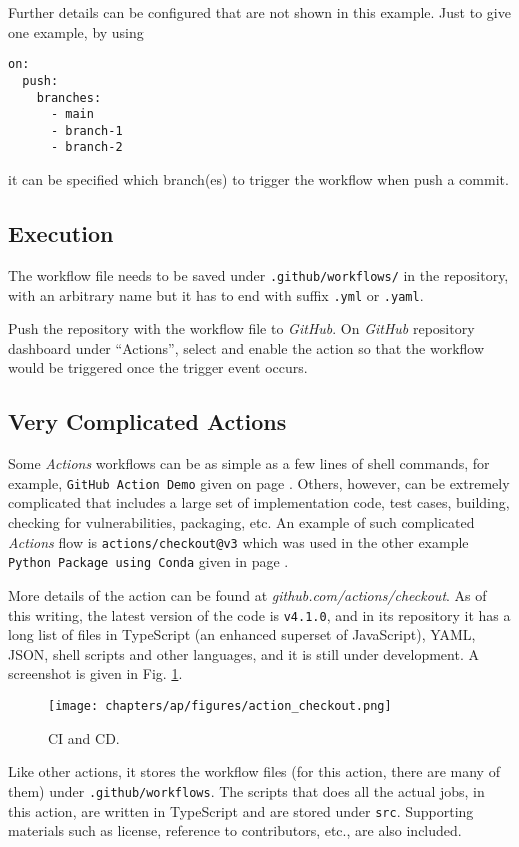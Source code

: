 Further details can be configured that are not shown in this example. Just to give one example, by using
\begin{lstlisting}
on:
  push:
    branches:
      - main
      - branch-1
      - branch-2
\end{lstlisting}
it can be specified which branch(es) to trigger the workflow when push a commit.

\subsection{Execution}

The workflow file needs to be saved under \verb|.github/workflows/| in the repository, with an arbitrary name but it has to end with suffix \verb|.yml| or \verb|.yaml|.

Push the repository with the workflow file to \textit{GitHub}. On \textit{GitHub} repository dashboard under ``Actions'', select and enable the action so that the workflow would be triggered once the trigger event occurs.

\subsection{Very Complicated Actions}

Some \textit{Actions} workflows can be as simple as a few lines of shell commands, for example, \verb|GitHub Action Demo| given on page \pageref{code:githubactionsdemo}. Others, however, can be extremely complicated that includes a large set of implementation code, test cases, building, checking for vulnerabilities, packaging, etc. An example of such complicated \textit{Actions} flow is \verb|actions/checkout@v3| which was used in the other example \verb|Python Package using Conda| given in page \pageref{code:pythonpackageusingconda}.

More details of the action can be found at \textit{github.com/actions/checkout}. As of this writing, the latest version of the code is \verb|v4.1.0|, and in its repository it has a long list of files in TypeScript (an enhanced superset of JavaScript), YAML, JSON, shell scripts and other languages, and it is still under development. A screenshot is given in Fig. \ref{ch:cicd:fig:actioncheckout}.
\begin{figure}[htbp]
	\centering
	\texttt{[image: chapters/ap/figures/action\_checkout.png]}
	\caption{CI and CD.} \label{ch:cicd:fig:actioncheckout}
\end{figure}
Like other actions, it stores the workflow files (for this action, there are many of them) under \verb|.github/workflows|. The scripts that does all the actual jobs, in this action, are written in TypeScript and are stored under \verb|src|. Supporting materials such as license, reference to contributors, etc., are also included.

